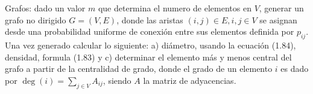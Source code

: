 \documentclass[letterpaper,11pt]{article}
\begin{document}
Grafos: dado un valor $m$ que determina el numero de elementos en $V$, generar un grafo no dirigido $G=(V,E)$, donde las aristas $(i,j)\in E, i,j\in V$ se asignan desde una probabilidad uniforme de conexión entre sus elementos definida por $p_{ij}$. Una vez generado calcular lo siguiente: a) diámetro, usando la ecuación (1.84), densidad, formula (1.83) y c) determinar el elemento más y menos central del grafo a partir de la centralidad de grado, donde el grado de un elemento $i$ es dado por $\deg(i) = \sum_{j\in V} A_{ij}$, siendo $A$ la matriz de adyacencias.
\end{document}
